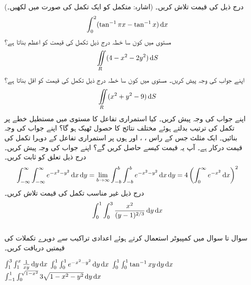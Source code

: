 درج  ذیل کی قیمت تلاش کریں۔ (اشارہ: متکمل کو ایک تکمل کی صورت میں لکھیں۔)
\begin{align*}
\int_0^2 (\tan^{-1}\pi x-\tan^{-1}x)\dif x
\end{align*}
مستوی  میں کون سا خطہ  درج ذیل تکمل کی قیمت کو  اعظم  بناتا ہے؟
\begin{align*}
\iint\limits_R (4-x^2-2y^2)\dif S
\end{align*}
اپنے جواب کی وجہ پیش کریں۔
مستوی  میں کون سا خطہ  درج ذیل تکمل کی قیمت کو اقل بناتا ہے؟
\begin{align*}
\iint\limits_R (x^2+y^2-9)\dif S
\end{align*}
اپنے جواب کی وجہ پیش کریں۔
کیا استمراری تفاعل  کا مستوی  میں مستطیل خطے  پر  تکمل کی ترتیب بدلتے ہوئے مختلف نتائج کا حصول ٹھیک ہو گا؟ اپنے جواب کی وجہ بنائیں۔
ایک مثلث جس کے راس  ، ،  اور  ہوں  پر استمراری تفاعل  کے  دوہرا  تکمل  کی قیمت درکار ہے۔ آپ یہ قیمت کیسے حاصل کریں گے؟ اپنے جواب کی وجہ پیش کریں۔
درج ذیل تعلق کو ثابت کریں۔
\begin{align*}
\int_{-\infty}^{\infty}\int_{-\infty}^{\infty} e^{-x^2-y^2}\dif x\dif y=\lim_{b\to\infty}\int_{-b}^b\int_{-b}^b e^{-x^2-y^2}\dif x\dif y=4\left(\int_0^{\infty}e^{-x^2}\dif x\right)^2
\end{align*}
درج ذیل غیر مناسب تکمل کی قیمت تلاش کریں۔
\begin{align*}
\int_0^1\int_0^3\frac{x^2}{(y-1)^{2/3}}\dif y\dif x
\end{align*}
\\
سوال  تا سوال  میں کمپیوٹر استعمال کرتے ہوئے اعدادی تراکیب سے دوہرے تکملات کی قیمتیں دریافت کریں۔

$\int_1^3\int_1^x\frac{1}{xy}\dif y\dif x$
$\int_0^1\int_0^1e^{-x^2-y^2}\dif y\dif x$
$\int_0^1\int_0^1\tan^{-1}xy\dif y\dif x$
$\int_{-1}^1\int_0^{\sqrt{1-x^2}}3\sqrt{1-x^2-y^2}\dif y\dif x$


